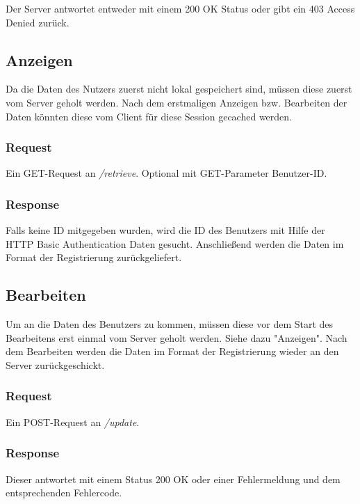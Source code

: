 \documentclass[ngerman]{scrartcl}
\begin{document}
		Der Server antwortet entweder mit einem 200 OK Status oder gibt ein 403 Access Denied zurück.
		
	\subsection{Anzeigen}
	
	Da die Daten des Nutzers zuerst nicht lokal gespeichert sind, müssen diese zuerst vom Server geholt werden. Nach dem erstmaligen Anzeigen bzw. Bearbeiten der Daten könnten diese vom Client für diese Session gecached werden.
	
		\subsubsection*{Request}
		
		Ein GET-Request an \textit{/retrieve}. Optional mit GET-Parameter Benutzer-ID.
		
		\subsubsection*{Response}
		
		Falls keine ID mitgegeben wurden, wird die ID des Benutzers mit Hilfe der HTTP Basic Authentication Daten gesucht. Anschließend werden die Daten im Format der Registrierung zurückgeliefert.
		
	\subsection{Bearbeiten}

	Um an die Daten des Benutzers zu kommen, müssen diese vor dem Start des Bearbeitens erst einmal vom Server geholt werden. Siehe dazu "Anzeigen". Nach dem Bearbeiten werden die Daten im Format der Registrierung wieder an den Server zurückgeschickt.
	
	\subsubsection*{Request}
		
		Ein POST-Request an \textit{/update}.
	
	\subsubsection*{Response}
	Dieser antwortet mit einem Status 200 OK oder einer Fehlermeldung und dem entsprechenden Fehlercode.
	
\end{document}
